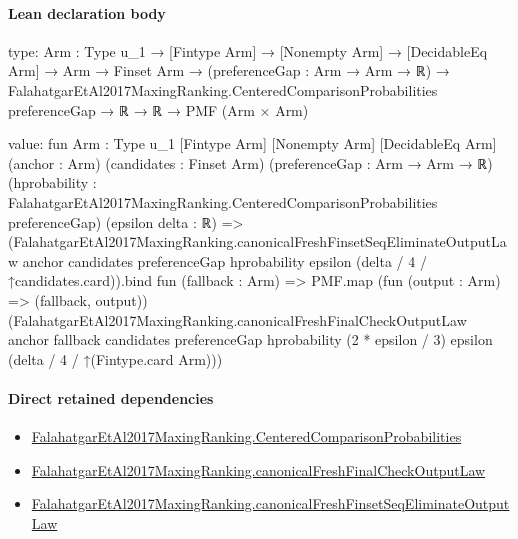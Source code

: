 \documentclass[10pt]{article}
\begin{document}
\paragraph{Lean declaration body}
\begin{ReviewVerbatim}
type:
{Arm : Type u_1} →
  [Fintype Arm] →
    [Nonempty Arm] →
      [DecidableEq Arm] →
        Arm →
          Finset Arm →
            (preferenceGap : Arm → Arm → ℝ) →
              FalahatgarEtAl2017MaxingRanking.CenteredComparisonProbabilities preferenceGap → ℝ → ℝ → PMF (Arm × Arm)

value:
fun {Arm : Type u_1} [Fintype Arm] [Nonempty Arm] [DecidableEq Arm] (anchor : Arm) (candidates : Finset Arm)
    (preferenceGap : Arm → Arm → ℝ)
    (hprobability : FalahatgarEtAl2017MaxingRanking.CenteredComparisonProbabilities preferenceGap)
    (epsilon delta : ℝ) =>
  (FalahatgarEtAl2017MaxingRanking.canonicalFreshFinsetSeqEliminateOutputLaw anchor candidates preferenceGap
        hprobability epsilon (delta / 4 / ↑candidates.card)).bind
    fun (fallback : Arm) =>
    PMF.map (fun (output : Arm) => (fallback, output))
      (FalahatgarEtAl2017MaxingRanking.canonicalFreshFinalCheckOutputLaw anchor fallback candidates preferenceGap
        hprobability (2 * epsilon / 3) epsilon (delta / 4 / ↑(Fintype.card Arm)))
\end{ReviewVerbatim}

\paragraph{Direct retained dependencies}
\begin{itemize}\raggedright
\item \hyperlink{paper-prerequisite-b99b697ef57f53ce}{Falahatgar\allowbreak{}Et\allowbreak{}Al2017\allowbreak{}Maxing\allowbreak{}Ranking.\allowbreak{}Centered\allowbreak{}Comparison\allowbreak{}Probabilities}
\item \hyperlink{governing-declaration-6f8a46fa91378263}{Falahatgar\allowbreak{}Et\allowbreak{}Al2017\allowbreak{}Maxing\allowbreak{}Ranking.\allowbreak{}canonical\allowbreak{}Fresh\allowbreak{}Final\allowbreak{}Check\allowbreak{}Output\allowbreak{}Law}
\item \hyperlink{governing-declaration-80739295f55f6395}{Falahatgar\allowbreak{}Et\allowbreak{}Al2017\allowbreak{}Maxing\allowbreak{}Ranking.\allowbreak{}canonical\allowbreak{}Fresh\allowbreak{}Finset\allowbreak{}Seq\allowbreak{}Eliminate\allowbreak{}Output\allowbreak{}Law}
\end{itemize}
\hypertarget{governing-declaration-9965e2e7c8a816eb}{}
\end{document}
